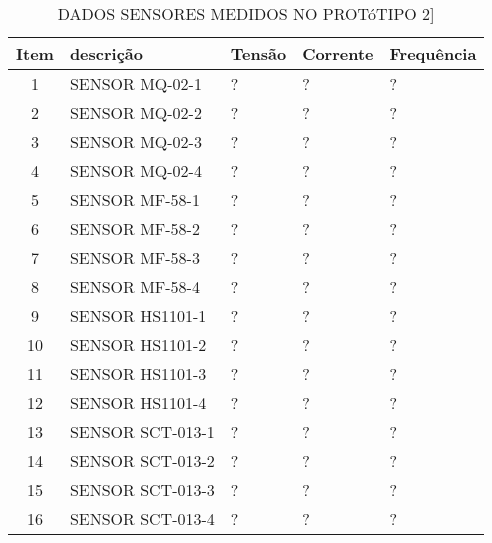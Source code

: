 \begin{table}
	\centering
	\caption{DADOS SENSORES MEDIDOS NO PROTóTIPO 2]}
	\begin{tabular}{ |c | p{3cm}| p{3cm} |p{3cm} | p{3cm} | } \hline
		\textbf{ Item} 	   & \textbf{descrição}	&\textbf{Tensão} &\textbf{Corrente} &\textbf{Frequência} \\ \hline
		1  & SENSOR MQ-02-1 & ? & ? & ? \\ \hline
		2  & SENSOR MQ-02-2 & ? & ? & ? \\ \hline
		3  & SENSOR MQ-02-3 & ? & ? & ? \\ \hline
		4  & SENSOR MQ-02-4 & ? & ? & ? \\ \hline
		5  & SENSOR MF-58-1 & ? & ? & ?\\ \hline
		6  & SENSOR MF-58-2 & ? & ? & ?\\ \hline
		7  & SENSOR MF-58-3 & ? & ? & ?\\ \hline
		8  & SENSOR MF-58-4 & ? & ? & ?\\ \hline
		9  & SENSOR HS1101-1 & ? & ? & ?\\ \hline
		10  & SENSOR HS1101-2 & ? & ? & ?\\ \hline
		11 & SENSOR HS1101-3 & ? & ? & ?\\ \hline
		12 & SENSOR HS1101-4 & ? & ? & ?\\ \hline
		13 & SENSOR SCT-013-1& ? & ? & ?\\ \hline
		14 & SENSOR SCT-013-2& ? & ? & ?\\ \hline
		15 & SENSOR SCT-013-3& ? & ? & ?\\ \hline
		16 & SENSOR SCT-013-4& ? & ? & ?\\ \hline
		
		
	\end{tabular}					
	
	
	\label{T15}\par
\end{table}


